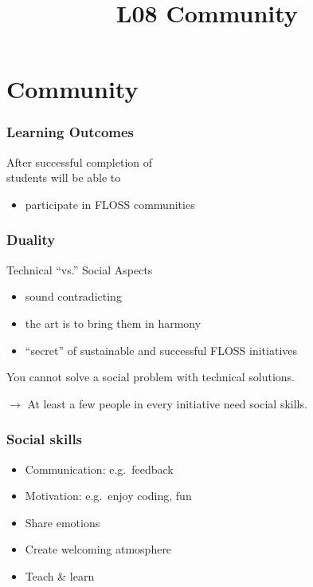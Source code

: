 

\title{L08 Community}




\section{Community}


\begin{frame}
	\frametitle{Learning Outcomes}
	After successful completion of \inserttitle \\
	students will be able to

	\begin{itemize}
	\item participate in FLOSS communities
	\end{itemize}
\end{frame}

\begin{frame}
	\frametitle{Duality}
	Technical ``vs.'' Social Aspects

	\begin{itemize}[<+-| alert@+>]
		\item sound contradicting
		\item the art is to bring them in harmony
		\item ``secret'' of sustainable and successful FLOSS initiatives
	\end{itemize}
	\vspace{1em}
	\pause[\thebeamerpauses]  %

	You cannot solve a social problem with technical solutions.
	\vspace{1em}
	\pause

	$\rightarrow$ At least a few people in every initiative need social skills.
\end{frame}

\begin{frame}
	\frametitle{Social skills}

	\begin{itemize}[<+-| alert@+>]
		\item Communication: e.g.\ feedback
		\item Motivation: e.g.\ enjoy coding, fun
		\item Share emotions
		\item Create welcoming atmosphere
		\item Teach \& learn
	\end{itemize}
\end{frame}

